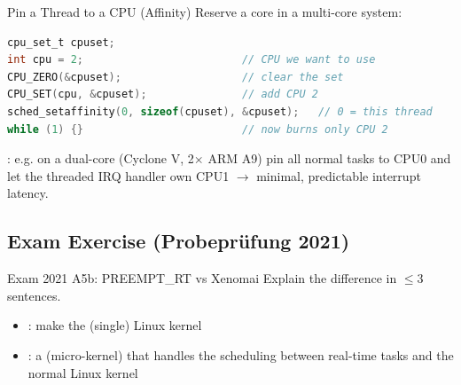 \begin{KR}{Pin a Thread to a CPU (Affinity)}
    Reserve a core in a multi-core system:
\begin{lstlisting}[language=C, style=basesmol, aboveskip=2pt, belowskip=2pt]
cpu_set_t cpuset;
int cpu = 2;                         // CPU we want to use
CPU_ZERO(&cpuset);                   // clear the set
CPU_SET(cpu, &cpuset);               // add CPU 2
sched_setaffinity(0, sizeof(cpuset), &cpuset);   // 0 = this thread
while (1) {}                         // now burns only CPU 2
\end{lstlisting}
\end{KR}

\begin{remark}
    : e.g. on a dual-core (Cyclone V, 2$\times$
    ARM A9) pin all normal tasks to CPU0 and let the threaded IRQ handler own CPU1
    $\to$ minimal, predictable interrupt latency.
\end{remark}

\subsection{Exam Exercise (Probepr\"ufung 2021)}

\begin{example2}{Exam 2021 A5b: PREEMPT\_RT vs Xenomai}
    Explain the difference in $\leq$3 sentences.
    \tcblower
    \begin{itemize}
        \item {}: make the (single) Linux kernel 
        \item {}: a  (micro-kernel) that handles
              the scheduling between real-time tasks and the normal Linux kernel
    \end{itemize}
\end{example2}

\raggedcolumns
